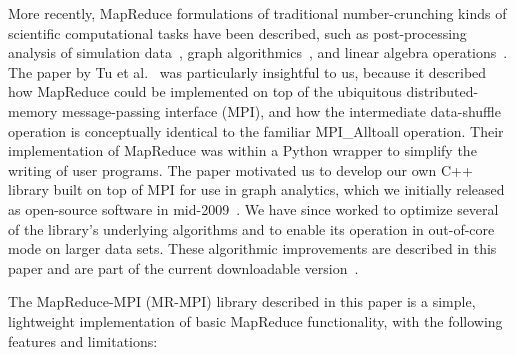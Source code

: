 More recently, MapReduce formulations of traditional number-crunching
kinds of scientific computational tasks have been described, such as
post-processing analysis of simulation data~\cite{Tu08}, graph
algorithmics~\cite{Cohen09}, and linear algebra operations~\cite{Ekanayake09}.
The paper by Tu et al.~\cite{Tu08} was particularly insightful to us,
because it described how MapReduce could be implemented on top of the
ubiquitous distributed-memory message-passing interface (MPI), and how
the intermediate data-shuffle operation is conceptually identical to
the familiar MPI\_Alltoall operation.  Their implementation of
MapReduce was within a Python wrapper to simplify the writing of user
programs.  The paper motivated us to develop our own C++ library built
on top of MPI for use in graph analytics, which we initially released
as open-source software in mid-2009~\cite{MRMPI}.  We have since
worked to optimize several of the library's underlying algorithms and
to enable its operation in out-of-core mode on larger data sets.
These algorithmic improvements are described in this paper and are
part of the current downloadable version~\cite{MRMPI}.

The MapReduce-MPI (MR-MPI) library described in this paper is a
simple, lightweight implementation of basic MapReduce functionality,
with the following features and limitations:

